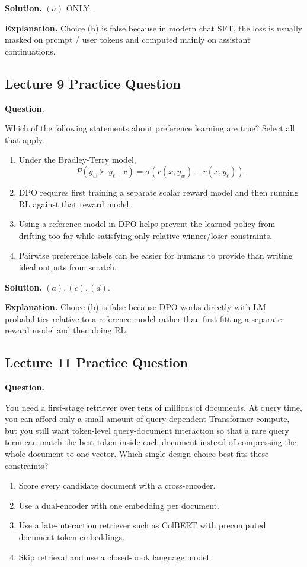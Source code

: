 \documentclass[10pt]{article}
\begin{document}
\textbf{Solution.} \((a)\) ONLY.

\textbf{Explanation.} Choice (b) is false because in modern chat SFT, the loss is usually masked on prompt / user tokens and computed mainly on assistant continuations.

\subsection*{Lecture 9 Practice Question}
\textbf{Question.}

Which of the following statements about preference learning are true? Select all that apply.
\begin{enumerate}
\item[(a)] Under the Bradley-Terry model,
\[
P(y_w \succ y_\ell \mid x)=\sigma(r(x,y_w)-r(x,y_\ell)).
\]
\item[(b)] DPO requires first training a separate scalar reward model and then running RL against that reward model.
\item[(c)] Using a reference model in DPO helps prevent the learned policy from drifting too far while satisfying only relative winner/loser constraints.
\item[(d)] Pairwise preference labels can be easier for humans to provide than writing ideal outputs from scratch.
\end{enumerate}

\textbf{Solution.} \((a),(c),(d)\).

\textbf{Explanation.} Choice (b) is false because DPO works directly with LM probabilities relative to a reference model rather than first fitting a separate reward model and then doing RL.

\subsection*{Lecture 11 Practice Question}
\textbf{Question.}

You need a first-stage retriever over tens of millions of documents. At query time, you can afford
only a small amount of query-dependent Transformer compute, but you still want token-level
query-document interaction so that a rare query term can match the best token inside each document
instead of compressing the whole document to one vector. Which single design choice best fits
these constraints?
\begin{enumerate}
\item[(a)] Score every candidate document with a cross-encoder.
\item[(b)] Use a dual-encoder with one embedding per document.
\item[(c)] Use a late-interaction retriever such as ColBERT with precomputed document token embeddings.
\item[(d)] Skip retrieval and use a closed-book language model.
\end{enumerate}
\end{document}
